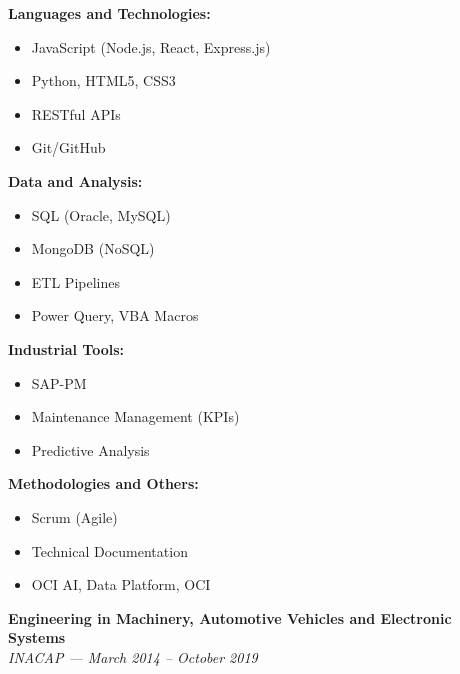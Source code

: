 \documentclass[10pt,letterpaper]{article}
\begin{document}
\noindent
\begin{minipage}[t]{0.48\textwidth}
\textbf{Languages and Technologies:}
\begin{itemize}
    \item JavaScript (Node.js, React, Express.js)
    \item Python, HTML5, CSS3
    \item RESTful APIs
    \item Git/GitHub
\end{itemize}

\vspace{0.2cm}

\textbf{Data and Analysis:}
\begin{itemize}
    \item SQL (Oracle, MySQL)
    \item MongoDB (NoSQL)
    \item ETL Pipelines
    \item Power Query, VBA Macros
\end{itemize}
\end{minipage}
\hfill
\begin{minipage}[t]{0.48\textwidth}
\textbf{Industrial Tools:}
\begin{itemize}
    \item SAP-PM
    \item Maintenance Management (KPIs)
    \item Predictive Analysis
\end{itemize}

\vspace{0.2cm}

\textbf{Methodologies and Others:}
\begin{itemize}
    \item Scrum (Agile)
    \item Technical Documentation
    \item OCI AI, Data Platform, OCI
\end{itemize}
\end{minipage}

\vspace{0.3cm}

\vspace{0.4cm}

\vspace{0.3cm}

\noindent \textbf{Engineering in Machinery, Automotive Vehicles and Electronic Systems} \\
\textit{INACAP — March 2014 – October 2019}
\end{document}
